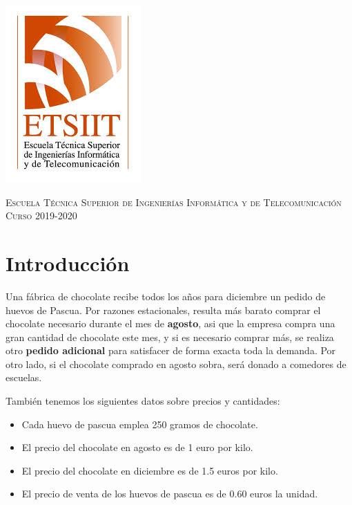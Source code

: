 \documentclass[11pt,a4paper]{article}
\begin{document}
\begin{titlepage}
\begin{minipage}{\textwidth}
\includegraphics[scale=0.3]{img/etsiit.jpeg}

\vspace{0.7cm}
\textsc{Escuela Técnica Superior de Ingenierías Informática y de Telecomunicación}\\
\vspace{1cm}
\textsc{Curso 2019-2020}
\end{minipage}
\end{titlepage}

\tableofcontents
\thispagestyle{empty}				%

\newpage

\setlength{\parskip}{1em}


\section{Introducción}

Una fábrica de chocolate recibe todos los años para diciembre un pedido de huevos de Pascua. Por razones estacionales, resulta más barato comprar el
chocolate necesario durante el mes de \textbf{agosto}, asi que la empresa compra una gran cantidad de chocolate este mes, y si es necesario comprar más,
se realiza otro \textbf{pedido adicional} para satisfacer de forma exacta toda la demanda. Por otro lado, si el chocolate comprado en agosto sobra, será
donado a comedores de escuelas.

También tenemos los siguientes datos sobre precios y cantidades:
\begin{itemize}
	\item Cada huevo de pascua emplea 250 gramos de chocolate.
	\item El precio del chocolate en agosto es de 1 euro por kilo.
	\item El precio del chocolate en diciembre es de 1.5 euros por kilo.
	\item El precio de venta de los huevos de pascua es de 0.60 euros la unidad.
\end{itemize}
\end{document}

